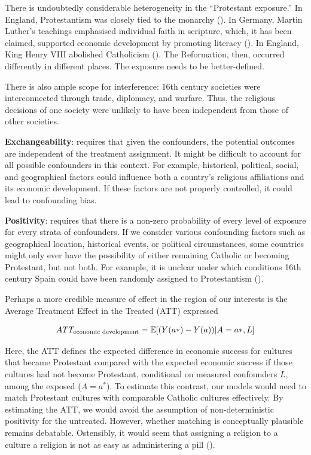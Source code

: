 \documentclass[
  singlecolumn]{article}
\begin{document}
There is undoubtedly considerable heterogeneity in the ``Protestant
exposure.'' In England, Protestantism was closely tied to the monarchy
(). In Germany, Martin
Luther's teachings emphasised individual faith in scripture, which, it
has been claimed, supported economic development by promoting literacy
(). In England,
King Henry VIII abolished Catholicism
(). The Reformation, then,
occurred differently in different places. The exposure needs to be
better-defined.

There is also ample scope for interference: 16th century societies were
interconnected through trade, diplomacy, and warfare. Thus, the
religious decisions of one society were unlikely to have been
independent from those of other societies.

\textbf{Exchangeability}: requires that given the confounders, the
potential outcomes are independent of the treatment assignment. It might
be difficult to account for all possible confounders in this context.
For example, historical, political, social, and geographical factors
could influence both a country's religious affiliations and its economic
development. If these factors are not properly controlled, it could lead
to confounding bias.

\textbf{Positivity}: requires that there is a non-zero probability of
every level of exposure for every strata of confounders. If we consider
various confounding factors such as geographical location, historical
events, or political circumstances, some countries might only ever have
the possibility of either remaining Catholic or becoming Protestant, but
not both. For example, it is unclear under which conditions 16th century
Spain could have been randomly assigned to Protestantism
().

Perhaps a more credible measure of effect in the region of our interests
is the Average Treatment Effect in the Treated (ATT) expressed

\[ATT_{\textnormal{economic~development}} = \mathbb{E}[(Y(a*)- Y(a))|A = a*,L]\]

Here, the ATT defines the expected difference in economic success for
cultures that became Protestant compared with the expected economic
success if those cultures had not become Protestant, conditional on
measured confounders \(L\), among the exposed (\(A = a^*\)). To estimate
this contrast, our models would need to match Protestant cultures with
comparable Catholic cultures effectively. By estimating the ATT, we
would avoid the assumption of non-deterministic positivity for the
untreated. However, whether matching is conceptually plausible remains
debatable. Ostensibly, it would seem that assigning a religion to a
culture a religion is not as easy as administering a pill
().
\end{document}
